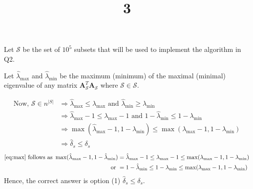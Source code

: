 \documentclass[a4paper, landscape]{article}
\title{3}
\date{}
\begin{document}
\maketitle
Let $\bm{\mathcal{S}}$ be the set of $10^5$ subsets that will be used to implement the algorithm in Q2.

Let $\hat{\lambda}_\text{max}$ and $\hat{\lambda}_\text{min}$ be the maximum (minimum) of the maximal (minimal) eigenvalue of any matrix $\bm{A}_\mathcal{S}^T\bm{A}_\mathcal{S}$ where $\mathcal{S}\in\bm{\mathcal{S}}$.

\begin{align}
\text{Now, } \bm{\mathcal{S}}\in n^{|S|} &\Rightarrow \hat{\lambda}_\text{max} \leq \lambda_\text{max} \text{ and } \hat{\lambda}_\text{min} \geq \lambda_\text{min}\\
&\Rightarrow \hat{\lambda}_\text{max} - 1 \leq \lambda_\text{max}-1 \text{ and } 1 - \hat{\lambda}_\text{min} \leq 1-\lambda_\text{min}\\
&\Rightarrow  \max(\hat{\lambda}_\text{max} - 1, 1 - \hat{\lambda}_\text{min}) \leq \max(\lambda_\text{max}-1, 1-\lambda_\text{min})\label{eq:max}\\
&\Rightarrow \hat{\delta}_s \leq \delta_s
\end{align}
\begin{align}
\text{\ref{eq:max} follows as }\max(\hat{\lambda}_\text{max} - 1, 1 - \hat{\lambda}_\text{min}) &= \hat{\lambda}_\text{max} - 1 \leq \lambda_\text{max}-1 \leq \max(\lambda_\text{max}-1, 1-\lambda_\text{min})\\
\text{or }&= 1 - \hat{\lambda}_\text{min} \leq 1 - \lambda_\text{min} \leq \max(\lambda_\text{max}-1, 1-\lambda_\text{min})
\end{align}
Hence, the correct answer is option (1) $\hat{\delta}_s \leq \delta_s$.
\end{document}
